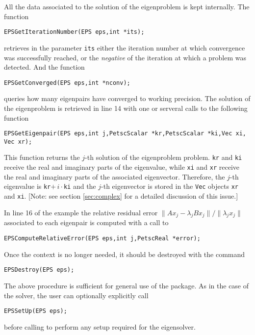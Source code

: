         All the data associated to the solution of the eigenproblem is kept internally. The function
	\begin{Verbatim}[fontsize=\small]
        EPSGetIterationNumber(EPS eps,int *its);
	\end{Verbatim}
        retrieves in the parameter \texttt{its} either the iteration number at which convergence was successfully reached, or the \emph{negative} of the iteration at which a problem was detected. And the function
	\begin{Verbatim}[fontsize=\small]
	EPSGetConverged(EPS eps,int *nconv);
	\end{Verbatim}
	queries how many eigenpairs have converged to working precision. The solution of the eigenproblem is retrieved in line 14 with one or serveral calls to the following function
	\begin{Verbatim}[fontsize=\small]
	EPSGetEigenpair(EPS eps,int j,PetscScalar *kr,PetscScalar *ki,Vec xi, Vec xr);
	\end{Verbatim}
	\label{GetEigenpair}
	This function returns the $j$-th solution of the eigenproblem problem. \texttt{kr} and \texttt{ki} receive the real and imaginary parts of the eigenvalue, while \texttt{xi} and \texttt{xr} receive the real and imaginary parts of the associated eigenvector. Therefore, the $j$-th eigenvalue is \texttt{kr}$+\,i\cdot$\texttt{ki} and the $j$-th eigenvector is stored in the \texttt{Vec} objects \texttt{xr} and \texttt{xi}. 
	[Note: see section \ref{sec:complex} for a detailed discussion of this issue.] 
	
	In line 16 of the example the relative residual error $\|Ax_j\!-\!\lambda_jBx_j\|/\|\lambda_jx_j\|$ associated to each eigenpair is computed with a call to
	\begin{Verbatim}[fontsize=\small]
	EPSComputeRelativeError(EPS eps,int j,PetscReal *error);
	\end{Verbatim}

	Once the  context is no longer needed, it should be destroyed with the command
	\begin{Verbatim}[fontsize=\small]
	EPSDestroy(EPS eps);
	\end{Verbatim}

	The above procedure is sufficient for general use of the  package. As in the case of the  solver, the user can optionally explicitly call 
	\begin{Verbatim}[fontsize=\small]
	EPSSetUp(EPS eps);
	\end{Verbatim}
before calling  to perform any setup required for the eigensolver.

